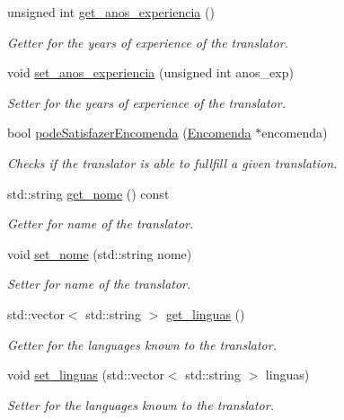 \begin{DoxyCompactItemize}
unsigned int \hyperlink{class_tradutor_a001f11f69661085cb11192d3c6f5d556}{get\-\_\-anos\-\_\-experiencia} ()
\begin{DoxyCompactList}\small\item\em Getter for the years of experience of the translator. \end{DoxyCompactList}\item 
void \hyperlink{class_tradutor_a938cfc1c263b3504fc4d7fbdc939b087}{set\-\_\-anos\-\_\-experiencia} (unsigned int anos\-\_\-exp)
\begin{DoxyCompactList}\small\item\em Setter for the years of experience of the translator. \end{DoxyCompactList}\item 
bool \hyperlink{class_tradutor_a1d22a38c8eaa3753d44b521bb3aab2af}{pode\-Satisfazer\-Encomenda} (\hyperlink{class_encomenda}{Encomenda} $\ast$encomenda)
\begin{DoxyCompactList}\small\item\em Checks if the translator is able to fullfill a given translation. \end{DoxyCompactList}\item 
std\-::string \hyperlink{class_tradutor_aada5c883969bb7903924f2f2ae376026}{get\-\_\-nome} () const 
\begin{DoxyCompactList}\small\item\em Getter for name of the translator. \end{DoxyCompactList}\item 
void \hyperlink{class_tradutor_aa50fdceab0ca03dfe5c2a1639bc5869e}{set\-\_\-nome} (std\-::string nome)
\begin{DoxyCompactList}\small\item\em Setter for name of the translator. \end{DoxyCompactList}\item 
std\-::vector$<$ std\-::string $>$ \hyperlink{class_tradutor_a011b86fa2dae11c6ccdda1cbeb844e94}{get\-\_\-linguas} ()
\begin{DoxyCompactList}\small\item\em Getter for the languages known to the translator. \end{DoxyCompactList}\item 
void \hyperlink{class_tradutor_a83ed5b48e00f3a15c579e209bb01d53f}{set\-\_\-linguas} (std\-::vector$<$ std\-::string $>$ linguas)
\begin{DoxyCompactList}\small\item\em Setter for the languages known to the translator. \end{DoxyCompactList}\item 

\end{DoxyCompactItemize}

